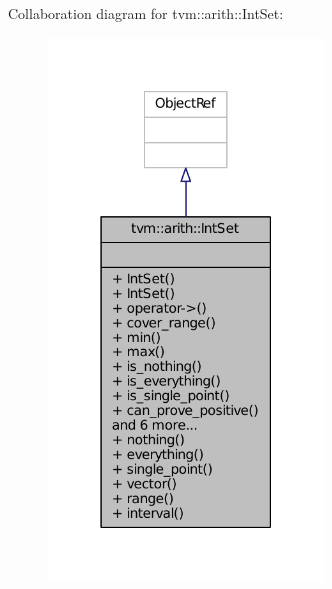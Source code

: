Collaboration diagram for tvm\+:\+:arith\+:\+:Int\+Set\+:
\nopagebreak
\begin{figure}[H]
\begin{center}
\leavevmode
\includegraphics[width=207pt]{classtvm_1_1arith_1_1IntSet__coll__graph}
\end{center}
\end{figure}
